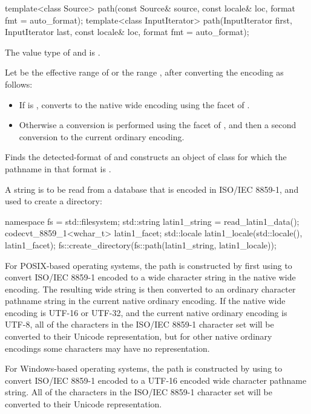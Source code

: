 %
\begin{itemdecl}
template<class Source>
  path(const Source& source, const locale& loc, format fmt = auto_format);
template<class InputIterator>
  path(InputIterator first, InputIterator last, const locale& loc, format fmt = auto_format);
\end{itemdecl}

\begin{itemdescr}
\pnum
\requires
The value type of  and  is
.

\pnum
\effects Let  be the effective range of 
or the range ,
after converting the encoding as
follows:
\begin{itemize}
\item
If  is , converts to the native
wide encoding using the 
facet of .
\item
Otherwise a conversion is performed using the
 facet of , and then a second
conversion to the current ordinary encoding.
\end{itemize}

\pnum
Finds the detected-format of 
and constructs an object of class 
for which the pathname in that format is .

\begin{example}
A string is to be read from a database
that is encoded in ISO/IEC 8859-1, and used to create a directory:
\begin{codeblock}
namespace fs = std::filesystem;
std::string latin1_string = read_latin1_data();
codecvt_8859_1<wchar_t> latin1_facet;
std::locale latin1_locale(std::locale(), latin1_facet);
fs::create_directory(fs::path(latin1_string, latin1_locale));
\end{codeblock}
For POSIX-based operating systems, the path is constructed by first using
 to convert ISO/IEC 8859-1 encoded
 to a wide character string in the native wide
encoding. The resulting wide string is then
converted to an ordinary character
pathname string in the current native ordinary encoding. If the
native wide encoding is UTF-16 or UTF-32, and the current native ordinary
encoding is UTF-8, all of the characters in the ISO/IEC 8859-1 character set
will be converted to their Unicode representation, but for other native
ordinary encodings some characters may have no representation.

For Windows-based operating systems, the path is constructed by
using  to convert ISO/IEC 8859-1 encoded
 to a UTF-16 encoded wide character pathname
string. All of the characters in the ISO/IEC 8859-1 character set will be
converted to their Unicode representation.
\end{example}
\end{itemdescr}

